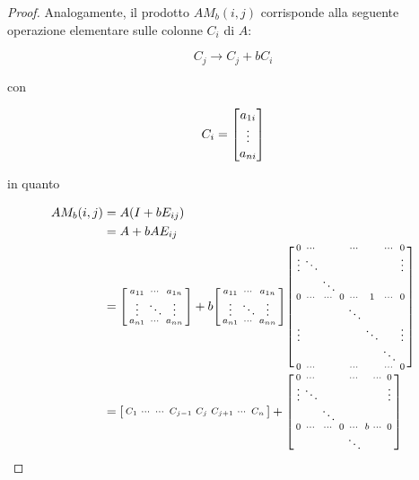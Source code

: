 \begin{proof}
	Analogamente, il prodotto $ A M_{b}(i,j) $ corrisponde alla seguente operazione elementare sulle colonne $ C_{i} $ di $ A $:
	
	\begin{equation}
		C_{j} \to C_{j} + b C_{i}
	\end{equation}

	con
	
	\begin{equation}
		C_{i} = \bmqty{ a_{1i} \\ \vdots \\ a_{ni} }
	\end{equation}
	
	in quanto
	
	\begin{align}
		\begin{split}
			A M_{b}(i,j) &= A (I + b E_{ij}) \\
			&= A + b A E_{ij} \\
			&= \sbmqty{ %
						a_{11} & \cdots & a_{1n} \\
						\vdots & \ddots & \vdots \\
						a_{n1} & \cdots & a_{nn} %
						} + %
			b \sbmqty{ %
						a_{11} & \cdots & a_{1n} \\
						\vdots & \ddots & \vdots \\
						a_{n1} & \cdots & a_{nn} %
						} %
			\sbmqty{ %
						0 & \cdots & & & \cdots & & \cdots & 0 \\
						\vdots & \ddots & & & & & & \vdots \\
						& & \ddots & & & & & \\
						0 & \cdots & \cdots & 0 & \cdots & 1 & \cdots & 0 \\
						& & & & \ddots & & & \\
						\vdots & & & & & \ddots & & \vdots \\
						& & & & & & \ddots & \\
						0 & \cdots & & & \cdots & & \cdots & 0 %
						} \\
			&= \sbmqty{ %
						C_{1} & \cdots & \cdots & C_{j-1} & C_{j} & C_{j+1} & \cdots & C_{n} %
						} + %
				\sbmqty{ %
							0 & \cdots & & & \cdots & & \cdots & 0 \\
							\vdots & \ddots & & & & & & \vdots \\
							& & \ddots & & & & & \\
							0 & \cdots & \cdots & 0 & \cdots & b & \cdots & 0 \\
							& & & & \ddots & & & \\
}
\end{split}
\end{align}
\end{proof}
